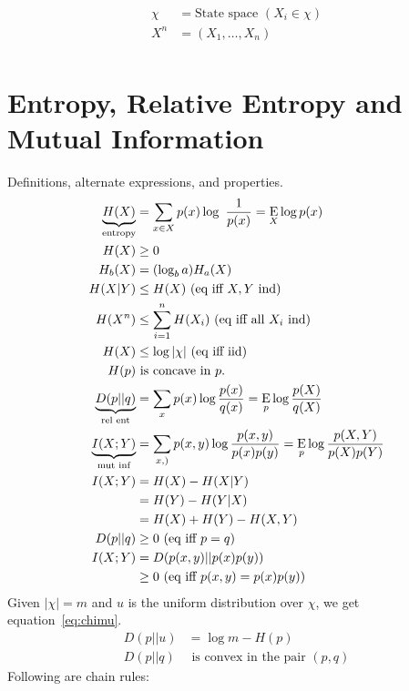 \documentclass[10pt]{article}
\DeclareMathOperator*{\E}{\mbox{\text{E}}}
\begin{document}
\begin{tiny}
\begin{multicols}{3}

\begin{align*}
\chi &= \text{State space } (X_i \in \chi) \\
X^n &=(X_1,\ldots,X_n) \\
\end{align*}

\section*{Entropy, Relative Entropy and Mutual Information}
Definitions, alternate expressions, and properties.
\begin{align}
    \underbrace{H(X)}_\text{entropy}&= \sum_{x\in X} p(x) \log\ \frac{1}{p(x)}
    = \E_X \log p(x) \label{defn: entropy}\\
H(X)& \geq 0 \\
H_b(X)&= (\log_b a)H_a(X) \\
H(X|Y)& \leq  H(X)\text{ (eq iff $X,Y$ ind)} \label{eq: H cond}\\
H(X^n)& \leq \sum_{i=1}^n H(X_i)\text{ (eq iff all $X_i$ ind)} \label{eq:jointsum}\\
H(X)&\leq  \log |\chi|  \text{ (eq iff iid) }\label{eq:alphabetentropy}\\
H(p)&\text{ is concave in $p$.}\\
\underbrace{D(p||q)}_\text{rel ent} & = \sum_x p(x) \log \frac{p(x)}{q(x)}=\E_p\log \frac{p(X)}{q(X)}\\
\underbrace{I(X;Y)}_\text{mut inf} & = \sum_{x,)} p(x,y) \log \frac{p(x,y)}{p(x)p(y)} = \E_p \log \frac{p(X,Y)}{p(X)p(Y)}\\
I(X;Y)&=H(X)-H(X|Y)\\
&=H(Y)-H(Y|X)\\
&=H(X)+H(Y)-H(X,Y)\\
D(p||q)&\geq 0 \text{ (eq iff $p=q$)}\\
I(X;Y)&=D(p(x,y)||p(x)p(y))\\
	&\geq 0 \text{ (eq iff $p(x,y)=p(x)p(y)$)}
\end{align}
Given $|\chi|=m$ and $u$ is the uniform distribution over $\chi$, we get equation~\ref{eq:chimu}.
\begin{align}
D(p||u)&=\log m - H(p)\label{eq:chimu}\\
D(p||q)&\text{ is convex in the pair }(p,q)
\end{align}
Following are chain rules:
\begin{align}

\end{align}
\end{multicols}
\end{tiny}
\end{document}
